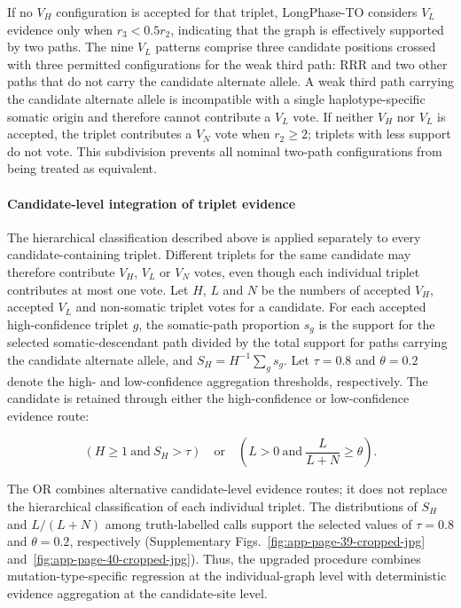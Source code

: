 \documentclass[pdflatex,sn-nature]{sn-jnl}
\begin{document}
If no \(V_H\) configuration is accepted for that triplet, LongPhase-TO considers \(V_L\) evidence only when \(r_3<0.5r_2\), indicating that the graph is effectively supported by two paths. The nine \(V_L\) patterns comprise three candidate positions crossed with three permitted configurations for the weak third path: RRR and two other paths that do not carry the candidate alternate allele. A weak third path carrying the candidate alternate allele is incompatible with a single haplotype-specific somatic origin and therefore cannot contribute a \(V_L\) vote. If neither \(V_H\) nor \(V_L\) is accepted, the triplet contributes a \(V_N\) vote when \(r_2\geq2\); triplets with less support do not vote. This subdivision prevents all nominal two-path configurations from being treated as equivalent.

\paragraph{Candidate-level integration of triplet evidence}\label{pattern-artifact-filtering-using-a-somatic-path-ratio}

The hierarchical classification described above is applied separately to every candidate-containing triplet. Different triplets for the same candidate may therefore contribute \(V_H\), \(V_L\) or \(V_N\) votes, even though each individual triplet contributes at most one vote. Let \(H\), \(L\) and \(N\) be the numbers of accepted \(V_H\), accepted \(V_L\) and non-somatic triplet votes for a candidate. For each accepted high-confidence triplet \(g\), the somatic-path proportion \(s_g\) is the support for the selected somatic-descendant path divided by the total support for paths carrying the candidate alternate allele, and \(S_H=H^{-1}\sum_g s_g\). Let \(\tau=0.8\) and \(\theta=0.2\) denote the high- and low-confidence aggregation thresholds, respectively. The candidate is retained through either the high-confidence or low-confidence evidence route:

\[
\left(H\geq1\ \text{and}\ S_H>\tau\right)
\quad\text{or}\quad
\left(L>0\ \text{and}\ \frac{L}{L+N}\geq\theta\right).
\]

The OR combines alternative candidate-level evidence routes; it does not replace the hierarchical classification of each individual triplet. The distributions of \(S_H\) and \(L/(L+N)\) among truth-labelled calls support the selected values of \(\tau=0.8\) and \(\theta=0.2\), respectively (Supplementary Figs.~\ref{fig:app-page-39-cropped-jpg} and~\ref{fig:app-page-40-cropped-jpg}). Thus, the upgraded procedure combines mutation-type-specific regression at the individual-graph level with deterministic evidence aggregation at the candidate-site level.
\end{document}
